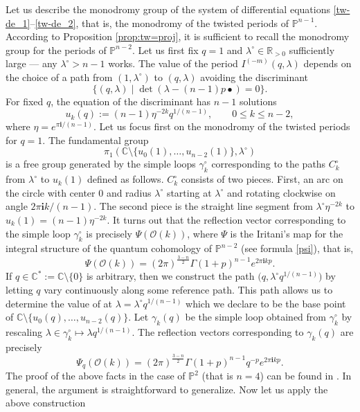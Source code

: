 \documentclass[pdftex]{sigma}
\numberwithin{equation}{section}
\newcommand{\CC}{\mathbb{C}}
\newcommand{\PP}{\mathbb{P}}
\newcommand{\RR}{\mathbb{R}}
\newcommand{\ii}{\mathbf{i}}
\renewcommand{\O}{\mathcal{O}}
\begin{document}
Let us describe the monodromy group of the system of differential
equations \eqref{tw-de_1}--\eqref{tw-de_2}, that is, the monodromy of
the twisted periods of $\PP^{n-1}$. According to Proposition
\ref{prop:tw=proj}, it is sufficient to recall the monodromy group for
the periods of $\PP^{n-2}$. Let us first fix $q=1$ and
$\lambda^\circ\in \RR_{>0}$ sufficiently large --- any
$\lambda^\circ>n-1$ works. The value of the period
$I^{(-m)}(q,\lambda)$ depends on the choice of a path from
$(1,\lambda^\circ)$ to $(q,\lambda)$ avoiding the discriminant
\[
\{(q,\lambda)\mid  \operatorname{det}(\lambda-(n-1)p\bullet) = 0\}.
\]
For fixed $q$, the equation of the discriminant has $n-1$ solutions
\[
u_k(q):=(n-1)\eta^{-2k} q^{1/(n-1)}, \qquad 0\leq k\leq n-2,
\]
where $\eta=e^{\pi \ii/(n-1)}$. Let us focus first on the monodromy of
the twisted periods for $q=1$. The fundamental group
\[
\pi_1(\CC\setminus{\{u_0(1),\dots,u_{n-2}(1)\}},\lambda^\circ)
\]
is a free group generated by the simple loops $\gamma_k^\circ$
corresponding to the paths $C_k^\circ$ from $\lambda^\circ$ to
$u_k(1)$ defined as follows. $C_k^\circ$ consists of two pieces. First,
an arc on the
circle with center $0$ and radius $\lambda^\circ$ starting at
$\lambda^\circ$ and rotating clockwise on angle $2\pi\ii k/(n-1)$. The
second piece is the straight line segment from $\lambda^\circ
\eta^{-2k}$ to $u_k(1)= (n-1) \eta^{-2k}$. It turns out that the
reflection vector corresponding to the simple loop $\gamma_k^\circ$ is
precisely $\Psi(\O(k))$, where $\Psi$ is the Iritani's map for the
integral structure of the quantum cohomology of $\PP^{n-2}$ (see
formula \eqref{psi}), that is,
\[
\Psi(\O(k)) = (2\pi)^{\frac{3-n}{2}} \Gamma(1+p)^{n-1} e^{2\pi\ii k p}.
\]
If $q\in \CC^*:=\CC\setminus{\{0\}}$ is arbitrary, then we construct
the path $\big(q,\lambda^\circ q^{1/(n-1)}\big)$ by letting $q$ vary
continuously along some reference path. This path allows us to
determine the value of  at
$\lambda=\lambda^\circ q^{1/(n-1)}$ which we declare to be the base
point of $\CC\setminus{\{u_0(q),\dots,u_{n-2}(q)\}}$. Let
$\gamma_k(q)$ be the simple loop obtained from $\gamma_k^\circ$ by
rescaling $\lambda\in \gamma_k^\circ\mapsto \lambda q^{1/(n-1)}$. The
reflection vectors corresponding to $\gamma_k(q)$ are precisely
\[
\Psi_q(\O(k)) =
(2\pi)^{\frac{3-n}{2}} \Gamma(1+p)^{n-1} q^{-p} e^{2\pi \ii k p}.
\]
The proof of the above facts in the case of $\PP^2$ (that is $n=4$)
can be found in \cite{Milanov:p2}. In general, the argument is
straightforward to generalize. Now let us apply the above construction
\end{document}
